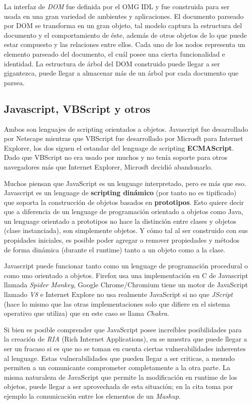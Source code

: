     La interfaz de \textit{DOM} fue definida por el OMG IDL y fue construida para ser usada en una gran variedad de ambientes y aplicaciones. El documento parseado por DOM se transforma en un gran objeto, tal modelo captura la estructura del documento y el comportamiento de éste, además de otros objetos de lo que puede estar compuesto y las relaciones entre ellos. Cada uno de los nodos representa un elemento parseado del documento, el cuál posee una cierta funcionalidad e identidad. La estructura de árbol del DOM construido puede llegar a ser gigantezca, puede llegar a almacenar más de un árbol por cada documento que parsea. 
            
    \subsection{Javascript, VBScript y otros}
    \label{chap2:JS}
    Ambos son lenguajes de scripting orientados a objetos. Javascript fue desarrollado por Netscape mientras que VBScript fue desarrollado por Microsft para Internet Explorer, los dos siguen el estandar del lenguage de scripting \textbf{ECMAScript}. Dado que VBScript no era usado por muchos y no tenía soporte para otros navegadores más que Internet Explorer, Microsft decidió abandonarlo.

    Muchos piensan que JavaScript es un lenguage interpretado, pero es más que eso. Javascript es un lenguage de \textbf{scripting dinámico} (por tanto no es tipificado) que soporta la construcción de objetos basados en \textbf{prototipos}. Esto quiere decir que a diferencia de un lenguage de programación orientado a objetos como Java, un lenguage orientado a prototipos no hace la distinción entre clases y objetos (clase instanciada), son simplemente objetos. Y cómo tal al ser construido con sus propidades iniciales, es posible poder agregar o remover propiedades y métodos de forma dinámica (durante el runtime) tanto a un objeto como a la clase.
            
    Javascript puede funcionar tanto como un lenguage de programación procedural o como uno orientado a objetos. Firefox usa una implementación en C de Javascript llamada \textit{Spider Monkey}, Google Chrome/Chromium tiene un motor de JavaScript llamado \textit{V8} e Internet Explore no usa realmente JavaScript si no que \textit{JScript} (hace lo mismo que las otras implementaciones solo que difiere en el sistema operativo que utiliza) que en este caso se llama \textit{Chakra}.
            
    Si bien es posible comprender que JavaScript posee increíbles posibilidades para la creación de \textit{RIA} (Rich Internet Applications), en \cite{barth2009attacks} se muestra que puede llegar a ser un fracaso si es que no se toman en cuenta ciertas vulnerabilidades inherentes al lenguage. Estas vulnerabilidades que pueden llegar a ser criticas, a menudo permiten a un comunicante comprometer completamente a la otra parte. La misma naturaleza de JavaScript que permite la modificación en runtime de los objetos, puede llegar a ser aprovechada de esta situación; en la cita toma por ejemplo la comunicación entre los elementos de un \textit{Mashup}.


